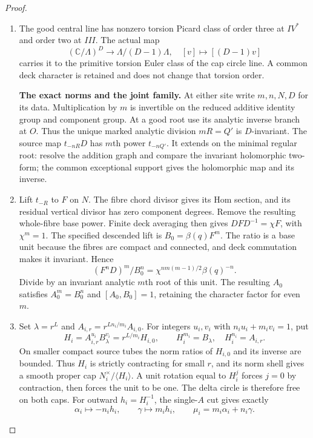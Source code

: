 \begin{proof}
\begin{enumerate}[label=\arabic*.]
\item The good central line has nonzero torsion Picard class of
order three at $IV^*$ and order two at $III$. The actual map
\[
 (\mathbb C/\Lambda)^D\longrightarrow\Lambda/(D-1)\Lambda,
                \quad[v]\longmapsto[(D-1)v]
\]
carries it to the primitive torsion Euler class of the cap
circle line. A common deck character is retained and does not
change that torsion order.

\par\medskip\noindent\textbf{The exact norms and the joint family.}
At either site write $m,n,N,D$ for its data. Multiplication by
$m$ is invertible on the reduced additive identity group and
component group. At a good root use its analytic inverse branch
at $O$. Thus the unique marked analytic division $mR=Q'$ is
$D$-invariant. The source map $t_{-nR}D$ has $m$th power
$t_{-nQ'}$. It extends on the minimal regular root: resolve the
addition graph and compare the invariant holomorphic two-form;
the common exceptional support gives the holomorphic map and
its inverse.

\item Lift $t_{-R}$ to $F$ on $N$. The fibre chord divisor gives its
Hom section, and its residual vertical divisor has zero
component degrees. Remove the resulting whole-fibre base power.
Finite deck averaging then gives
$DFD^{-1}=\chi F$, with $\chi^m=1$.
The specified descended lift is $B_0=\beta(q)F^m$.
The ratio is a base unit because the fibres are compact and
connected, and deck commutation makes it invariant. Hence
\[
       (F^nD)^m/B_0^n
          =\chi^{nm(m-1)/2}\beta(q)^{-n}.
\]
Divide by an invariant analytic $m$th root of this unit.
The resulting $A_0$ satisfies $A_0^m=B_0^n$ and
$[A_0,B_0]=1$, retaining the character factor for even $m$.

\item Set $\lambda=r^L$ and
$A_{i,r}=r^{Ln_i/m_i}A_{i,0}$. For integers $u_i,v_i$ with
$n_i u_i+m_i v_i=1$, put
\[
 H_i=A_{i,r}^{u_i}B_\lambda^{v_i}
       =r^{L/m_i}H_{i,0},\qquad
 H_i^{m_i}=B_\lambda,\quad H_i^{n_i}=A_{i,r}.                  \tag{F46.9}
\]
On smaller compact source tubes the norm ratios of $H_{i,0}$
and its inverse are bounded. Thus $H_i$ is strictly contracting
for small $r$, and its norm shell gives a smooth proper cap
$N_i^\times/\langle H_i\rangle$. A unit rotation equal to
$H_i^j$ forces $j=0$ by contraction, then forces the unit to
be one. The delta circle is therefore free on both caps.
For outward $h_i=H_i^{-1}$, the single-$A$ cut gives exactly
\[
 \alpha_i\longmapsto-n_i h_i,\qquad
 \gamma\longmapsto m_i h_i,\qquad
 \mu_i=m_i\alpha_i+n_i\gamma.                                 \tag{F46.10}
\]


\end{enumerate}
\end{proof}
